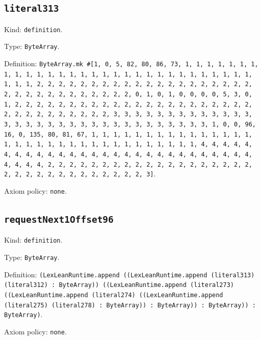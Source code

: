 \documentclass[11pt]{article}
\begin{document}
\subsection*{\texttt{literal313}}
\noindent Kind: \texttt{definition}.\par
\noindent Type: \texttt{ByteArray}.\par
\noindent Definition: \texttt{ByteArray.mk \#[1, 0, 5, 82, 80, 86, 73, 1, 1, 1, 1, 1, 1, 1, 1, 1, 1, 1, 1, 1, 1, 1, 1, 1, 1, 1, 1, 1, 1, 1, 1, 1, 1, 1, 1, 1, 1, 1, 1, 1, 2, 2, 2, 2, 2, 2, 2, 2, 2, 2, 2, 2, 2, 2, 2, 2, 2, 2, 2, 2, 2, 2, 2, 2, 2, 2, 2, 2, 2, 2, 2, 2, 0, 1, 0, 1, 0, 0, 0, 0, 5, 3, 0, 1, 2, 2, 2, 2, 2, 2, 2, 2, 2, 2, 2, 2, 2, 2, 2, 2, 2, 2, 2, 2, 2, 2, 2, 2, 2, 2, 2, 2, 2, 2, 2, 2, 3, 3, 3, 3, 3, 3, 3, 3, 3, 3, 3, 3, 3, 3, 3, 3, 3, 3, 3, 3, 3, 3, 3, 3, 3, 3, 3, 3, 3, 3, 3, 3, 1, 0, 0, 96, 16, 0, 135, 80, 81, 67, 1, 1, 1, 1, 1, 1, 1, 1, 1, 1, 1, 1, 1, 1, 1, 1, 1, 1, 1, 1, 1, 1, 1, 1, 1, 1, 1, 1, 1, 1, 1, 1, 1, 4, 4, 4, 4, 4, 4, 4, 4, 4, 4, 4, 4, 4, 4, 4, 4, 4, 4, 4, 4, 4, 4, 4, 4, 4, 4, 4, 4, 4, 4, 4, 4, 2, 2, 2, 2, 2, 2, 2, 2, 2, 2, 2, 2, 2, 2, 2, 2, 2, 2, 2, 2, 2, 2, 2, 2, 2, 2, 2, 2, 2, 2, 2, 2, 3]}.\par
\noindent Axiom policy: \texttt{none}.\par
\subsection*{\texttt{requestNext1Offset96}}
\noindent Kind: \texttt{definition}.\par
\noindent Type: \texttt{ByteArray}.\par
\noindent Definition: \texttt{(LexLeanRuntime.append ((LexLeanRuntime.append (literal313) (literal312) : ByteArray)) ((LexLeanRuntime.append (literal273) ((LexLeanRuntime.append (literal274) ((LexLeanRuntime.append (literal275) (literal278) : ByteArray)) : ByteArray)) : ByteArray)) : ByteArray)}.\par
\noindent Axiom policy: \texttt{none}.\par
\end{document}
